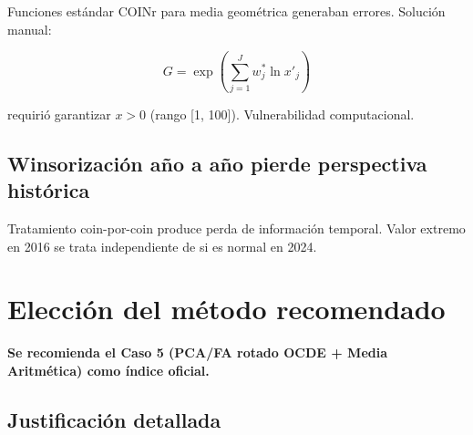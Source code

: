 Funciones estándar COINr para media geométrica generaban errores. Solución manual:

\begin{equation}
    G = \exp\left(\sum_{j=1}^{J} w_j^* \ln x'_j\right)
\end{equation}

requirió garantizar $x > 0$ (rango [1, 100]). Vulnerabilidad computacional.

\subsection{Winsorización año a año pierde perspectiva histórica}

Tratamiento coin-por-coin produce perda de información temporal. Valor extremo en 2016 se trata independiente de si es normal en 2024.

\section{Elección del método recomendado}

\textbf{Se recomienda el Caso 5 (PCA/FA rotado OCDE + Media Aritmética) como índice oficial.}

\subsection{Justificación detallada}

